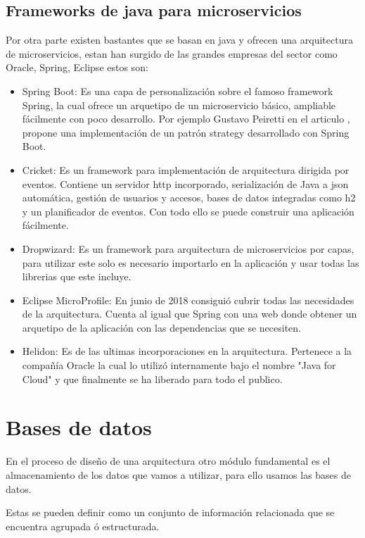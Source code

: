 \documentclass[12pt]{report} %
\begin{document}
 \subsection{Frameworks de java para microservicios}
 Por otra parte existen bastantes que se basan en java y ofrecen una arquitectura de microservicios, estan han surgido de las grandes empresas del sector como Oracle, Spring, Eclipse estos son:

 \begin{itemize}
 	\item Spring Boot: Es una capa de personalización sobre el famoso framework Spring, la cual ofrece un arquetipo de un microservicio básico, ampliable fácilmente con poco desarrollo. Por ejemplo Gustavo Peiretti en el articulo \cite{StrategySpringBoot}, propone una implementación de un patrón strategy desarrollado con Spring Boot.
 	\item Cricket: Es un framework para implementación de arquitectura dirigida por eventos. Contiene un servidor http incorporado, serialización de Java a json automática, gestión de usuarios y accesos, bases de datos integradas como h2 y un planificador de eventos. Con todo ello se puede construir una aplicación fácilmente.
 	\item Dropwizard: Es un framework para arquitectura de microservicios por capas, para utilizar este solo es necesario importarlo en la aplicación y usar todas las librerias que este incluye.
 	\item Eclipse MicroProfile: En junio de 2018 consiguió cubrir todas las necesidades de la arquitectura. Cuenta al igual que Spring con una web donde obtener un arquetipo de la aplicación con las dependencias que se necesiten.
 	\item Helidon: Es de las ultimas incorporaciones en la arquitectura. Pertenece a la compañía Oracle la cual lo utilizó internamente bajo el nombre "Java for Cloud" y que finalmente se ha liberado para todo el publico. 
 \end{itemize}
	
	\section{Bases de datos}
	En el proceso de diseño de una arquitectura otro módulo fundamental es el almacenamiento de los datos que vamos a utilizar, para ello usamos las bases de datos.

	Estas se pueden definir como un conjunto de información relacionada que se encuentra agrupada ó estructurada.
	
\end{document}
